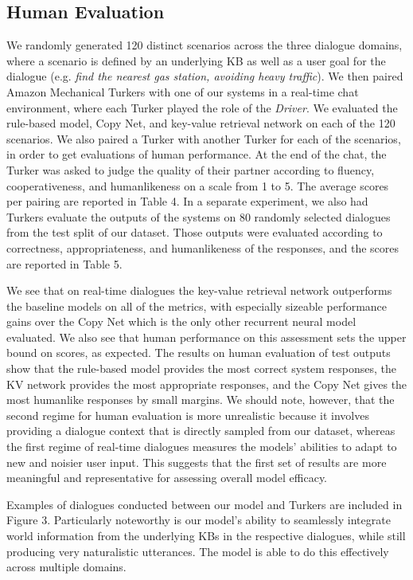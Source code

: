 \documentclass[11pt,a4paper]{article}
\begin{document}
\subsection{Human Evaluation}
  We randomly generated 120 distinct scenarios across the three dialogue domains, where a scenario is defined by an underlying KB as well as a user goal for the dialogue (e.g. \emph{find the nearest gas station, avoiding heavy traffic}). We then paired Amazon Mechanical Turkers with one of our systems in a real-time chat environment, where each Turker played the role of the \emph{Driver}. We evaluated the rule-based model, Copy Net, and key-value retrieval network on each of the 120 scenarios. We also paired a Turker with another Turker for each of the scenarios, in order to get evaluations of human performance. At the end of the chat, the Turker was asked to judge the quality of their partner according to fluency, cooperativeness, and humanlikeness on a scale from 1 to 5. The average scores per pairing are reported in Table 4. In a separate experiment, we also had Turkers evaluate the outputs of the systems on 80 randomly selected dialogues from the test split of our dataset. Those outputs were evaluated according to correctness, appropriateness, and humanlikeness of the responses, and the scores are reported in Table 5.

  We see that on real-time dialogues the key-value retrieval network outperforms the baseline models on all of the metrics, with especially sizeable performance gains over the Copy Net which is the only other recurrent neural model evaluated. We also see that human performance on this assessment sets the upper bound on scores, as expected. The results on human evaluation of test outputs show that the rule-based model provides the most correct system responses, the KV network provides the most appropriate responses, and the Copy Net gives the most humanlike responses by small margins. We should note, however, that the second regime for human evaluation is more unrealistic because it involves providing a dialogue context that is directly sampled from our dataset, whereas the first regime of real-time dialogues measures the models' abilities to adapt to new and noisier user input. This suggests that the first set of results are more meaningful and representative for assessing overall model efficacy. 

  Examples of dialogues conducted between our model and Turkers are included in Figure 3. Particularly noteworthy is our model's ability to seamlessly integrate world information from the underlying KBs in the respective dialogues, while still producing very naturalistic utterances. The model is able to do this effectively across multiple domains.
\end{document}
